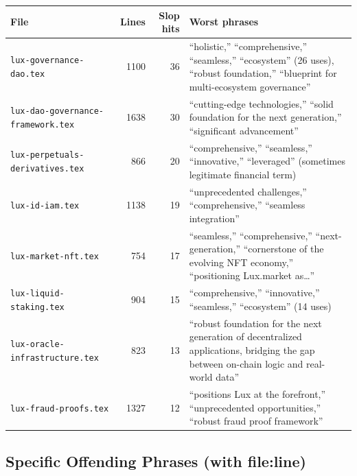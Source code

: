 \documentclass[11pt,a4paper]{article}
\begin{document}
\begin{tabular}{lrrp{6cm}}
\toprule
\textbf{File} & \textbf{Lines} & \textbf{Slop hits} & \textbf{Worst phrases} \\
\midrule
\texttt{lux-governance-dao.tex} & 1100 & 36 & ``holistic,'' ``comprehensive,'' ``seamless,'' ``ecosystem'' (26 uses), ``robust foundation,'' ``blueprint for multi-ecosystem governance'' \\
\texttt{lux-dao-governance-framework.tex} & 1638 & 30 & ``cutting-edge technologies,'' ``solid foundation for the next generation,'' ``significant advancement'' \\
\texttt{lux-perpetuals-derivatives.tex} & 866 & 20 & ``comprehensive,'' ``seamless,'' ``innovative,'' ``leveraged'' (sometimes legitimate financial term) \\
\texttt{lux-id-iam.tex} & 1138 & 19 & ``unprecedented challenges,'' ``comprehensive,'' ``seamless integration'' \\
\texttt{lux-market-nft.tex} & 754 & 17 & ``seamless,'' ``comprehensive,'' ``next-generation,'' ``cornerstone of the evolving NFT economy,'' ``positioning Lux.market as\ldots'' \\
\texttt{lux-liquid-staking.tex} & 904 & 15 & ``comprehensive,'' ``innovative,'' ``seamless,'' ``ecosystem'' (14 uses) \\
\texttt{lux-oracle-infrastructure.tex} & 823 & 13 & ``robust foundation for the next generation of decentralized applications, bridging the gap between on-chain logic and real-world data'' \\
\texttt{lux-fraud-proofs.tex} & 1327 & 12 & ``positions Lux at the forefront,'' ``unprecedented opportunities,'' ``robust fraud proof framework'' \\
\bottomrule
\end{tabular}

\subsection{Specific Offending Phrases (with file:line)}
\end{document}
